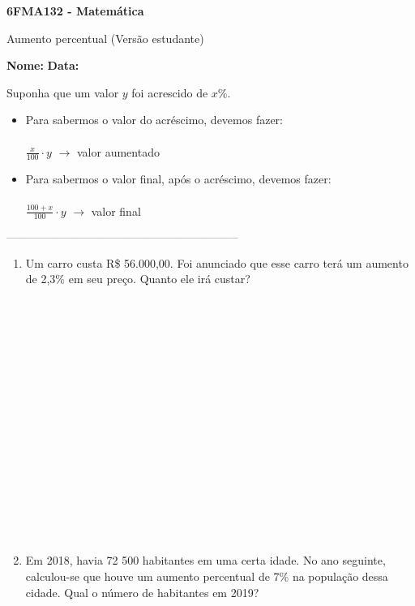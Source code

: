 \documentclass[a4paper,14pt]{article}
\begin{document}
	
	\noindent\textbf{6FMA132 - Matemática} 
	
	\begin{center}Aumento percentual (Versão estudante)
	\end{center}
	
	\noindent\textbf{Nome:} \underline{\hspace{10cm}}
	\noindent\textbf{Data:} \underline{\hspace{4cm}}
	
	
	\begin{multicols}{2}
	    \noindent Suponha que um valor $y$ foi acrescido de $x\%$.
	    \begin{itemize}
	    	\item Para sabermos o valor do acréscimo, devemos fazer: \\\\ $\frac{x}{100} \cdot y$ $\longrightarrow$ valor aumentado
	    	\item Para sabermos o valor final, após o acréscimo, devemos fazer: \\\\ $\frac{100 + x}{100} \cdot y$ $\longrightarrow$ valor final
	    \end{itemize}
		\noindent\textsubscript{--------------------------------------------------------------------------}
		\begin{enumerate} 
			\item Um carro custa R\$ 56.000,00. Foi anunciado que esse carro terá um aumento de 2,3\% em seu preço. Quanto ele irá custar? \\\\\\\\\\\\\\\\\\\\\\\\\\\\\\\\\\
			\item Em 2018, havia 72 500 habitantes em uma certa idade. No ano seguinte, calculou-se que houve um aumento percentual de 7\% na população dessa cidade. Qual o número de habitantes em 2019? \\\\\\\\\\\\\\\\\\\\

\end{enumerate}
\end{multicols}
\end{document}
